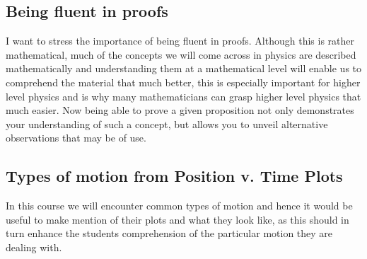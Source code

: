 \documentclass[12pt]{article}
\theoremstyle{break}
\begin{document}
\subsection{Being fluent in proofs}
I want to stress the importance of being fluent in proofs. Although this is rather mathematical, much of the concepts we will come across in physics are described mathematically and understanding them at a mathematical level will enable us to comprehend the material that much better, this is especially important for higher level physics and is why many mathematicians can grasp higher level physics that much easier. Now being able to prove a given proposition not only demonstrates your understanding of such a concept, but allows you to unveil alternative observations that may be of use.



\subsection{Types of motion from Position v. Time Plots}
In this course we will encounter common types of motion and hence it would be useful to make mention of their plots and what they look like, as this should in turn enhance the students comprehension of the particular motion they are dealing with.
\end{document}
